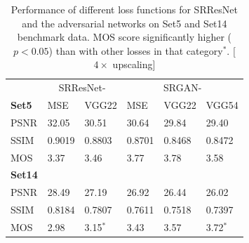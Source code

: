 \documentclass[10pt,twocolumn,letterpaper]{article}
\begin{document}
\begin{table}[]
\centering
\caption{Performance of different loss functions for SRResNet and the adversarial networks on Set5 and Set14 benchmark data. MOS score significantly higher ($p<0.05$) than with other losses in that category$^*$. [$4\times$ upscaling]}
\label{tab:perceptual}
\begin{adjustbox}{max width=0.48\textwidth}
\begin{tabular}{lll | lll}
& \multicolumn{2}{c}{SRResNet-} & \multicolumn{3}{c}{SRGAN-} \\
\textbf{Set5} & MSE & VGG22 & MSE & VGG22 & VGG54 \\
\hline

PSNR &  32.05 & 30.51 & 30.64 & 29.84 & 29.40 \\
SSIM & 0.9019 & 0.8803 & 0.8701 & 0.8468 & 0.8472 \\
MOS  &  3.37 & 3.46 & 3.77 & 3.78 & 3.58 \\ [0.3cm]
\textbf{Set14} & & &  \\
\hline
PSNR &  28.49 & 27.19 & 26.92 & 26.44 & 26.02 \\
SSIM &  0.8184 & 0.7807 & 0.7611 & 0.7518 & 0.7397 \\
MOS  &  2.98 & 3.15$^*$ & 3.43 & 3.57 & 3.72$^*$  \\
\end{tabular}
\end{adjustbox}
\end{table}
\end{document}

